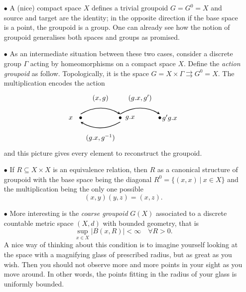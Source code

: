\begin{itemize}
\item[$\bullet$] A (nice) compact space $X$ defines a trivial groupoid $G=G^0=X$ and source and target are the identity; in the opposite direction if the base space is a point, the groupoid is a group. One can already see how the notion of groupoid generalises both spaces and groups as promised.  \\

\item[$\bullet$] As an intermediate situation between these two cases, consider a discrete group $\Gamma$ acting by homeomorphisms on a compact space $X$. Define the \textit{action groupoid} as follow. Topologically, it is the space $G= X\times \Gamma \rightrightarrows G^0 = X$. The multiplication encodes the action
\[\begin{tikzpicture}
\draw  (0,1) node {$(x,g)$};
\draw  (0,-1) node {$(g.x,g^{-1})$};
\draw  (2,1) node {$(g.x,g')$};
\draw [>=stealth, ->, thick] (-1,0.2) to[bend left] (1,0.2);
\draw [>=stealth, ->,thick] (1,-0.2) to[bend left] (-1,-0.2);
\draw [>=stealth, ->, thick] (1,0.2) to[bend left] (3,0.2);
\draw  (-1,0) node {$\bullet$};
\draw  (-1.5,0) node {$x$};
\draw  (1,0) node {$\bullet$};
\draw  (1.5,0) node {$g.x$};
\draw  (3,0) node {$\bullet$};
\draw  (3.5,0) node {$g'g.x$};
\end{tikzpicture}\]
and this picture gives every element to reconstruct the groupoid.\\

\item[$\bullet$] If $R\subseteq X\times X $ is an equivalence relation, then $R$ as a canonical structure of groupoid with the base space being the diagonal $R^0 = \{ (x,x) \ | \ x\in X\}$ and the multiplication being the only one possible
\[(x,y)(y,z) = (x,z).\] 

\item[$\bullet$] More interesting is the \textit{coarse groupoid} $G(X)$ associated to a discrete countable metric space $(X,d)$ with bounded geometry, that is
\[\sup_{x\in X} |B(x,R)| < \infty \quad \forall R>0.\]
A nice way of thinking about this condition is to imagine yourself looking at the space with a magnifying glass of prescribed radius, but as great as you wish. Then you should not observe more and more points in your sight as you move around. In other words, the points fitting in the radius of your glass is uniformly bounded.\\


\end{itemize}
